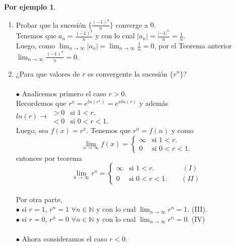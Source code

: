 \documentclass{article}
\theoremstyle{definition}
\newtheorem*{ej}{Por ejemplo}
\theoremstyle{remark}
\begin{document}
\begin{ej} \; \\
    \begin{enumerate}
      \item Probar que la sucesión $\{ \frac{(-1)^y}{n} \}$ converge a $0$. \\
        Tenemos que $a_n=\frac{(-1)^y}{n}$ y con lo cual $|a_n| = \frac{|-1|^n}{n}=\frac{1}{n}$. \\
        Luego, como $\lim_{n \to \infty }{|a_n|} = \lim_{n \to \infty }{\frac{1}{n}}=0$, por el Teorema anterior $\lim_{n \to \infty}{\frac{(-1)^n}{n}}=0$.
      \item ¿Para que valores de $r$ es convergente la sucesión $\{r^n\}$? \\\\
        \textcolor{rojop2}{$\bullet$} Analicemos primero el caso $r>0$. \\
        Recordemos que $r^x=e^{ln(r^x)}=e^{xln(r)}$ y además $ln(r) \rightarrow \begin{array}{ll}
           > 0 & \text{si } 1<r. \\
           < 0 & \text{si } 0<r<1.
        \end{array}$ \\ 
        Luego, sea $f(x)=r^x$. Tenemos que $r^n=f(n)$ y como\\ $$\lim_{x \to \infty }{f(x)} = \left\{
          \begin{array}{ll}
            \infty & \text{si } 1<r. \\
            0 & \text{si } 0<r<1.
        \end{array}\right. $$
        entonces por teorema 
        $$\lim_{n \to \infty }{r^n} = \left\{
          \begin{array}{ll}
            \infty & \text{si } 1<r. \quad \quad \quad \quad (I) \\
            0 & \text{si } 0<r<1. \quad \quad (II)
        \end{array}\right. $$ \\
        Por otra parte, \\
        $\bullet$ si $r=1$, $r^n=1$ $\forall n \in \mathbb{N}$ y con lo cual $\lim_{n \to \infty} r^n = 1.$ \quad (III). \\
        $\bullet$ si $r=0$, $r^n=0$ $\forall n \in \mathbb{N}$ y con lo cual $\lim_{n \to \infty} r^n = 0$. (IV) \\\\
        \textcolor{rojop2}{$\bullet$} Ahora consideramos el caso $r<0$. \\\\

\end{enumerate}
\end{ej}
\end{document}
